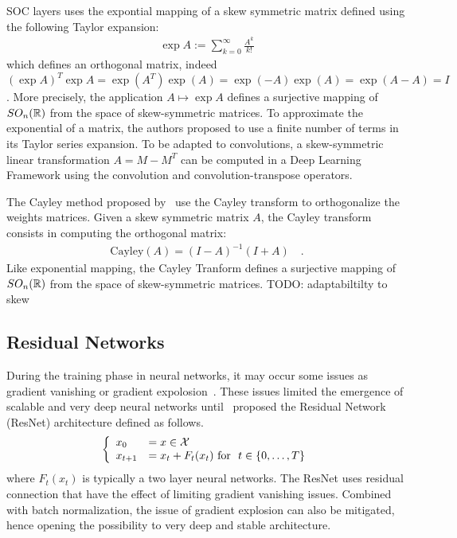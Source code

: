 SOC layers uses the expontial mapping of a skew symmetric matrix defined using the following Taylor expansion:
\begin{align*}
  \exp{A}:=\sum_{k=0}^{\infty}\frac{A^k}{k!}
\end{align*}
which defines an orthogonal matrix, indeed $(\exp{A})^T\exp{A} = \exp(A^T)\exp(A) = \exp(-A)\exp(A) = \exp(A-A)=I$ . More precisely, the application $A\mapsto\exp{A}$ defines a surjective mapping of $SO_n(\mathbb{R})$ from the space of skew-symmetric matrices. To approximate the exponential of a matrix, the authors proposed to use a finite number of terms in its Taylor series expansion.  To be adapted to convolutions, a skew-symmetric linear transformation $A = M-M^T$ can be  computed in a Deep Learning Framework using the  convolution and convolution-transpose operators.



The Cayley method proposed by~\citet{trockman2021orthogonalizing} use the Cayley transform to orthogonalize the weights matrices. Given a skew symmetric matrix $A$, the Cayley transform consists in computing the orthogonal matrix:
\begin{align*}
   \text{Cayley}(A)= (I - A)^{-1} (I + A) \quad.
\end{align*}
Like exponential mapping, the Cayley Tranform defines  a surjective mapping of $SO_n(\mathbb{R})$ from the space of skew-symmetric matrices. TODO: adaptabiltilty to skew





\subsection{Residual Networks}

During the training phase in neural networks, it may occur some issues as gradient vanishing or gradient expolosion~\citep{hochreiter2001gradient}. These issues limited the emergence of scalable and very deep neural networks until~\cite{he2016deep} proposed the Residual Network (ResNet) architecture defined as follows.
\begin{align*}
  \left\{
    \begin{array}{ll}
    x_0 &= x\in\XX\\
    x_{t+1} &= x_t+F_{{t}}(x_{t}) \  \text{for } \ t\in\{0, \dots,T\}
  \end{array}
  \right.
\end{align*}
where $F_{{t}}(x_{t})$ is typically a two layer neural networks. The ResNet uses residual connection that have the effect of limiting gradient vanishing issues. Combined with batch normalization, the issue of gradient explosion can also be mitigated, hence opening the possibility to very deep and stable architecture. 

